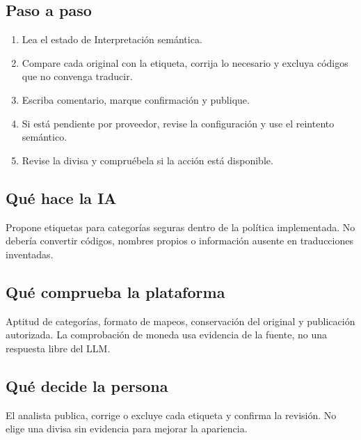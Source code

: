 \subsection{Paso a paso}
\begin{enumerate}
\item Lea el estado de Interpretación semántica.\par\nopagebreak[4]
\item Compare cada original con la etiqueta, corrija lo necesario y excluya códigos que no convenga traducir.\par\nopagebreak[4]
\item Escriba comentario, marque confirmación y publique.\par\nopagebreak[4]
\item Si está pendiente por proveedor, revise la configuración y use el reintento semántico.\par\nopagebreak[4]
\item Revise la divisa y compruébela si la acción está disponible.\par\nopagebreak[4]
\end{enumerate}
\subsection{Qué hace la IA}
Propone etiquetas para categorías seguras dentro de la política implementada. No debería convertir códigos, nombres propios o información ausente en traducciones inventadas.

\subsection{Qué comprueba la plataforma}
Aptitud de categorías, formato de mapeos, conservación del original y publicación autorizada. La comprobación de moneda usa evidencia de la fuente, no una respuesta libre del LLM.

\subsection{Qué decide la persona}
El analista publica, corrige o excluye cada etiqueta y confirma la revisión. No elige una divisa sin evidencia para mejorar la apariencia.

